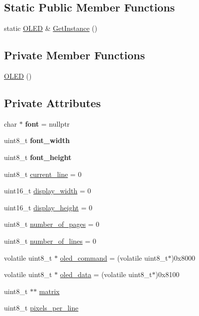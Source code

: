 \subsection*{Static Public Member Functions}
\begin{DoxyCompactItemize}
\item 
static \hyperlink{class_o_l_e_d}{O\+L\+ED} \& \hyperlink{class_o_l_e_d_a7b261492679b5e67d346e97ed575332e}{Get\+Instance} ()
\end{DoxyCompactItemize}
\subsection*{Private Member Functions}
\begin{DoxyCompactItemize}
\item 
\hyperlink{class_o_l_e_d_a8eabf371b5642d99800adb759dab27fd}{O\+L\+ED} ()
\end{DoxyCompactItemize}
\subsection*{Private Attributes}
\begin{DoxyCompactItemize}
\item 
\hypertarget{class_o_l_e_d_a5bb36d22f2c4f536ff0e456af496291c}{}\label{class_o_l_e_d_a5bb36d22f2c4f536ff0e456af496291c} 
char $\ast$ {\bfseries font} = nullptr
\item 
\hypertarget{class_o_l_e_d_a3c9ea103adf6c860a2534135e9a25ba8}{}\label{class_o_l_e_d_a3c9ea103adf6c860a2534135e9a25ba8} 
uint8\+\_\+t {\bfseries font\+\_\+width}
\item 
\hypertarget{class_o_l_e_d_a85b91421932866dea031921799ba83a3}{}\label{class_o_l_e_d_a85b91421932866dea031921799ba83a3} 
uint8\+\_\+t {\bfseries font\+\_\+height}
\item 
uint8\+\_\+t \hyperlink{class_o_l_e_d_aebd62601be5e2ceef6295721f17fc013}{current\+\_\+line} = 0
\item 
uint16\+\_\+t \hyperlink{class_o_l_e_d_ae88ab3d6d63a7ead982a3b7cc673eefe}{display\+\_\+width} = 0
\item 
uint16\+\_\+t \hyperlink{class_o_l_e_d_aa14ebb59666d7822288115a04ac0a34b}{display\+\_\+height} = 0
\item 
uint8\+\_\+t \hyperlink{class_o_l_e_d_aaac99b0eb4e9dfe92b8571488dc89288}{number\+\_\+of\+\_\+pages} = 0
\item 
uint8\+\_\+t \hyperlink{class_o_l_e_d_a9ea1c55112deede1a61142af276a6bc9}{number\+\_\+of\+\_\+lines} = 0
\item 
volatile uint8\+\_\+t $\ast$ \hyperlink{class_o_l_e_d_af0a85ccd0274347b8c1ac77d298a14cf}{oled\+\_\+command} = (volatile uint8\+\_\+t$\ast$)0x8000
\item 
volatile uint8\+\_\+t $\ast$ \hyperlink{class_o_l_e_d_a1bc54d49808f92ddfc354511b692df6f}{oled\+\_\+data} = (volatile uint8\+\_\+t$\ast$)0x8100
\item 
uint8\+\_\+t $\ast$$\ast$ \hyperlink{class_o_l_e_d_a9d32e21189940afba24deab0a2bc0126}{matrix}
\item 
uint8\+\_\+t \hyperlink{class_o_l_e_d_a6ddac7b826eccac8c682c5246ef52b29}{pixels\+\_\+per\+\_\+line}
\end{DoxyCompactItemize}



